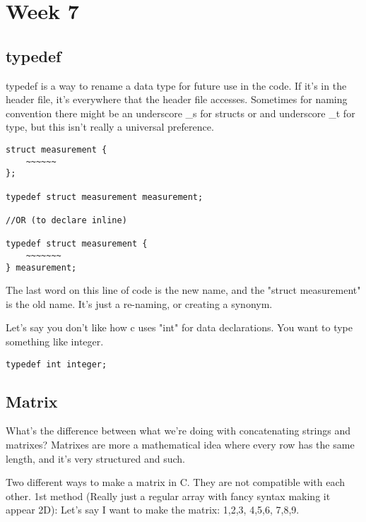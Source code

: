 \documentclass[12pt]{article}
\theoremstyle{definition}
\begin{document}
\section{Week 7}

\subsection{typedef}
typedef is a way to rename a data type for future use in the code. If it's in the header file, it's everywhere that the header file accesses. Sometimes for naming convention there might be an underscore \_s for structs or and underscore \_t for type, but this isn't really a universal preference.

\begin{lstlisting}
struct measurement {
    ~~~~~~
};

typedef struct measurement measurement;

//OR (to declare inline)

typedef struct measurement {
    ~~~~~~~
} measurement;
\end{lstlisting}
The last word on this line of code is the new name, and the "struct measurement" is the old name. It's just a re-naming, or creating a synonym. 

Let's say you don't like how c uses "int" for data declarations. You want to type something like integer. 
\begin{lstlisting}
typedef int integer;
\end{lstlisting}

\subsection{Matrix}
    What's the difference between what we're doing with concatenating strings and matrixes? Matrixes are more a mathematical idea where every row has the same length, and it's very structured and such.

\note Two different ways to make a matrix in C. They are not compatible with each other.
\note 1st method (Really just a regular array with fancy syntax making it appear 2D):
Let's say I want to make the matrix: {{1,2,3}, {4,5,6}, {7,8,9}}. 
\end{document}
